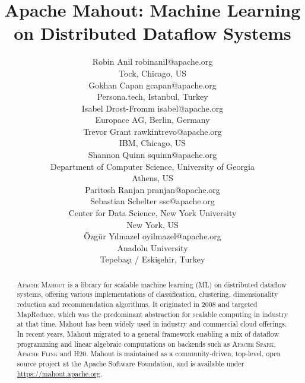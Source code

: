 \documentclass[twoside,11pt]{article}
\begin{document}
\title{Apache Mahout: Machine Learning on Distributed Dataflow Systems}

\author{\name Robin Anil \email robinanil@apache.org\\
  \addr Tock, Chicago, US\\
  \name Gokhan Capan \email gcapan@apache.org\\
  \addr Persona.tech, Istanbul, Turkey\\
  \name Isabel Drost-Fromm \email isabel@apache.org\\
  \addr Europace AG, Berlin, Germany\\
  \name Trevor Grant \email rawkintrevo@apache.org\\
  \addr IBM, Chicago, US\\
  \name Shannon Quinn \email squinn@apache.org\\
  \addr Department of Computer Science, University of Georgia\\
  \addr Athens, US\\ 
  \name Paritosh Ranjan \email pranjan@apache.org\\
  \name Sebastian Schelter \email ssc@apache.org\\
  \addr Center for Data Science, New York University\\
  \addr New York, US\\
  \name Özgür Yılmazel \email oyilmazel@apache.org\\
  \addr Anadolu University\\
  \addr Tepebaşı / Eskişehir, Turkey\\
}

\editor{}

\maketitle

\begin{abstract}%
\textsc{Apache Mahout} is a library for scalable machine learning (ML) on distributed dataflow systems, offering various implementations of classification, clustering, dimensionality reduction and recommendation algorithms. It originated in 2008 and targeted MapReduce, which was the predominant abstraction for scalable computing in industry at that time. Mahout has been widely used in industry and commercial cloud offerings. In recent years, Mahout migrated to a general framework enabling a mix of dataflow programming and linear algebraic computations on backends such as \textsc{Apache Spark}, \textsc{Apache Flink} and \textsc{H20}. Mahout is maintained as a community-driven, top-level, open source project at the Apache Software Foundation, and is available under \url{https://mahout.apache.org}. 
\end{abstract}
\end{document}
